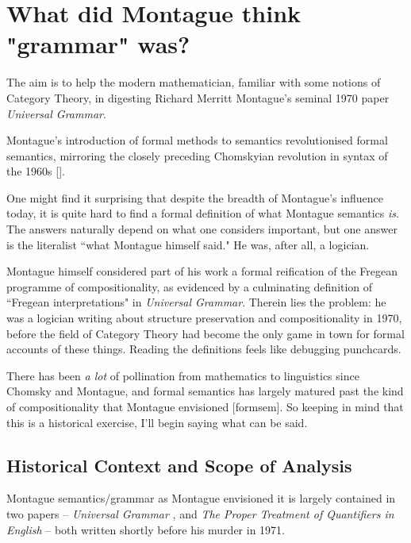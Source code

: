 \section{What did Montague think "grammar" was?}

 The aim is to help the modern mathematician, familiar with some notions of Category Theory, in digesting Richard Merritt Montague's seminal 1970 paper \emph{Universal Grammar}.

 Montague's introduction of formal methods to semantics revolutionised formal semantics, mirroring the closely preceding Chomskyian revolution in syntax of the 1960s [].

 One might find it surprising that despite the breadth of Montague's influence today, it is quite hard to find a formal definition of what Montague semantics \emph{is}. The answers naturally depend on what one considers important, but one answer is the literalist ``what Montague himself said." He was, after all, a logician.


Montague himself considered part of his work a formal reification of the Fregean programme of compositionality, as evidenced by a culminating definition of ``Fregean interpretations" in \emph{Universal Grammar}. Therein lies the problem: he was a logician writing about structure preservation and compositionality in 1970, before the field of Category Theory had become the only game in town for formal accounts of these things. Reading the definitions feels like debugging punchcards.


There has been \emph{a lot} of pollination from mathematics to linguistics since Chomsky and Montague, and formal semantics has largely matured past the kind of compositionality that Montague envisioned [formsem]. So keeping in mind that this is a historical exercise, I'll begin saying what can be said.

\subsection{Historical Context and Scope of Analysis}

Montague semantics/grammar as Montague envisioned it is largely contained in two papers -- \emph{Universal Grammar} \cite{montague1970universal}, and \emph{The Proper Treatment of Quantifiers in English} \cite{montague1973proper} -- both written shortly before his murder in 1971.

